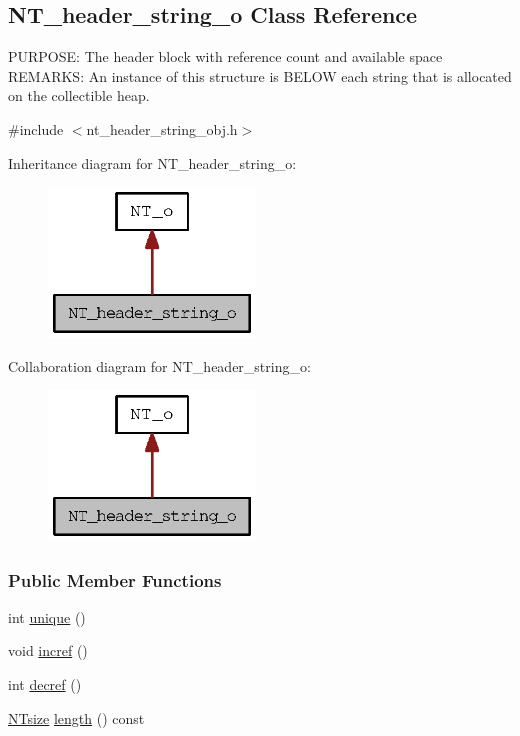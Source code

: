 \subsection{NT\_\-header\_\-string\_\-o Class Reference}
\label{class_n_t__header__string__o}


PURPOSE: The header block with reference count and available space REMARKS: An instance of this structure is BELOW each string that is allocated on the collectible heap.  




{\ttfamily \#include $<$nt\_\-header\_\-string\_\-obj.h$>$}



Inheritance diagram for NT\_\-header\_\-string\_\-o:
\nopagebreak
\begin{figure}[H]
\begin{center}
\leavevmode
\includegraphics[width=156pt]{class_n_t__header__string__o__inherit__graph}
\end{center}
\end{figure}


Collaboration diagram for NT\_\-header\_\-string\_\-o:
\nopagebreak
\begin{figure}[H]
\begin{center}
\leavevmode
\includegraphics[width=156pt]{class_n_t__header__string__o__coll__graph}
\end{center}
\end{figure}
\subsubsection*{Public Member Functions}
\begin{DoxyCompactItemize}
\item 
int \hyperlink{class_n_t__header__string__o_a92a585c4b44bbf322e9fdfd28522ae61}{unique} ()
\item 
void \hyperlink{class_n_t__header__string__o_ab28cecc5494950047671f7361b02fcd4}{incref} ()
\item 
int \hyperlink{class_n_t__header__string__o_accd1da1a4dea0409ddd8671893091b16}{decref} ()
\item 
\hyperlink{nt__types_8h_a06c124f2e4469769b58230253ce0560b}{NTsize} \hyperlink{class_n_t__header__string__o_a61fa8c4d190d5b89bc34fe0c8394abff}{length} () const 
\end{DoxyCompactItemize}
